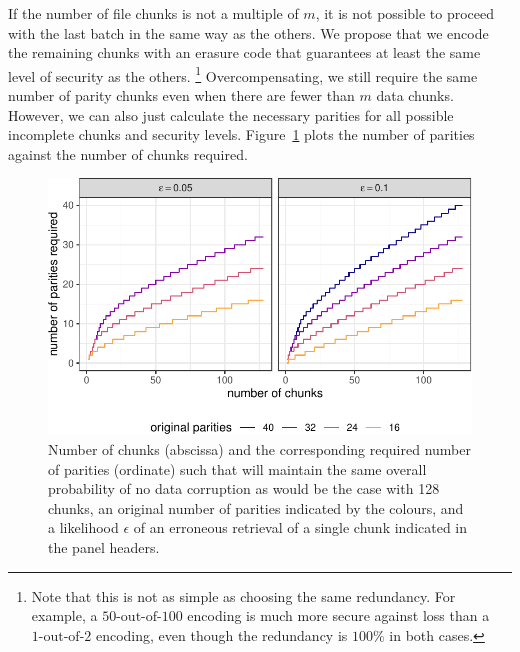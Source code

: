 \documentclass[manuscript,screen,review]{acmart}
\begin{document}
If the number of file chunks is not a multiple of $m$, it is not possible to proceed with the last batch in the same way as the others. We propose that we encode the remaining chunks with an erasure code that guarantees at least the same level of security as the others.%
%
\footnote{Note that this is not as simple as choosing the same redundancy. For example, a $50\text{-out-of-}100$ encoding is much more secure against loss than a $1\text{-out-of-}2$ encoding, even though the redundancy is $100\%$ in both cases.}
%
Overcompensating, we still require the same number of parity chunks even when there are fewer than $m$ data chunks. However, we can also just calculate the necessary parities for all possible incomplete chunks and security levels. Figure~\ref{fig:maintain} plots the number of parities against the number of chunks required.
%
\begin{figure}[!ht]
  \centering
  \includegraphics[width=.8\textwidth]{figs/fig-maintain-1.pdf}
  \caption{Number of chunks (abscissa) and the corresponding required number of parities (ordinate) such that will maintain the same overall probability of no data corruption as would be the case with 128 chunks, an original number of parities indicated by the colours, and a likelihood $\epsilon$ of an erroneous retrieval of a single chunk indicated in the panel headers.}
  \label{fig:maintain}
\end{figure}
\end{document}
